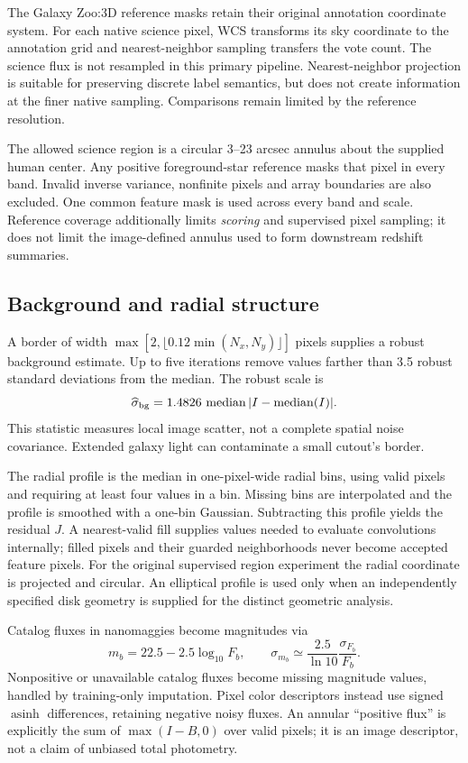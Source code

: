 \documentclass[10pt]{article}
\begin{document}
The Galaxy Zoo:3D reference masks retain their original annotation coordinate
system. For each native science pixel, WCS transforms its sky coordinate to
the annotation grid and nearest-neighbor sampling transfers the vote count.
The science flux is not resampled in this primary pipeline. Nearest-neighbor
projection is suitable for preserving discrete label semantics, but does not
create information at the finer native sampling. Comparisons remain limited
by the reference resolution.

The allowed science region is a circular 3--23 arcsec annulus about the supplied
human center. Any positive foreground-star reference masks that pixel in every
band. Invalid inverse variance, nonfinite pixels and array boundaries are
also excluded. One common feature mask is used across every band and scale.
Reference coverage additionally limits \emph{scoring} and supervised pixel
sampling; it does not limit the image-defined annulus used to form downstream
redshift summaries.

\subsection{Background and radial structure}
A border of width $\max[2,\lfloor0.12\min(N_x,N_y)\rfloor]$ pixels supplies
a robust background estimate. Up to five iterations remove values farther
than 3.5 robust standard deviations from the median. The robust scale is
\begin{equation}
 \widehat\sigma_{\rm bg}=1.4826\,
 \operatorname{median}|I-\operatorname{median}(I)|.
\end{equation}
This statistic measures local image scatter, not a complete spatial noise
covariance. Extended galaxy light can contaminate a small cutout's border.

The radial profile is the median in one-pixel-wide radial bins, using valid
pixels and requiring at least four values in a bin. Missing bins are
interpolated and the profile is smoothed with a one-bin Gaussian. Subtracting
this profile yields the residual $J$. A nearest-valid fill supplies values
needed to evaluate convolutions internally; filled pixels and their guarded
neighborhoods never become accepted feature pixels. For the original supervised
region experiment the radial coordinate is projected and circular. An elliptical
profile is used only when an independently specified disk geometry is supplied
for the distinct geometric analysis.

Catalog fluxes in nanomaggies become magnitudes via
\begin{equation}
 m_b=22.5-2.5\log_{10}F_b,\qquad
 \sigma_{m_b}\simeq\frac{2.5}{\ln10}\frac{\sigma_{F_b}}{F_b}.
\end{equation}
Nonpositive or unavailable catalog fluxes become missing magnitude values,
handled by training-only imputation. Pixel color descriptors instead use
signed $\operatorname{asinh}$ differences, retaining negative noisy fluxes.
An annular ``positive flux'' is explicitly the sum of
$\max(I-B,0)$ over valid pixels; it is an image descriptor, not a claim of
unbiased total photometry.
\end{document}
